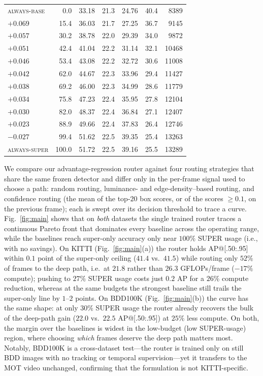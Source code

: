 \begin{table}[t]
\begin{minipage}[t]{0.49\textwidth}
\begin{tabular}{lrrrrrr}
\midrule
\textsc{always-base} & 0.0 & 33.18 & 21.3 & 24.76 & 40.4 & 8389\\
$+0.069$ & 15.4 & 36.03 & 21.7 & 27.25 & 36.7 & 9145\\
$+0.057$ & 30.2 & 38.78 & 22.0 & 29.39 & 34.0 & 9872\\
$+0.051$ & 42.4 & 41.04 & 22.2 & 31.14 & 32.1 & 10468\\
$+0.046$ & 53.4 & 43.08 & 22.2 & 32.72 & 30.6 & 11008\\
$+0.042$ & 62.0 & 44.67 & 22.3 & 33.96 & 29.4 & 11427\\
$+0.038$ & 69.2 & 46.00 & 22.3 & 34.99 & 28.6 & 11779\\
$+0.034$ & 75.8 & 47.23 & 22.4 & 35.95 & 27.8 & 12104\\
$+0.030$ & 82.0 & 48.37 & 22.4 & 36.84 & 27.1 & 12407\\
$+0.023$ & 88.9 & 49.66 & 22.4 & 37.83 & 26.4 & 12746\\
$-0.027$ & 99.4 & 51.62 & 22.5 & 39.35 & 25.4 & 13263\\
\textsc{always-super} & 100.0 & 51.72 & 22.5 & 39.16 & 25.5 & 13289\\
\bottomrule
\end{tabular}
\end{minipage}
\end{table}

We compare our advantage-regression router against four routing strategies that
share the same frozen detector and differ only in the per-frame signal used to
choose a path: random routing, luminance- and edge-density--based routing, and
confidence routing (the mean of the top-$20$ box scores, or of the scores
$\ge0.1$, on the previous frame); each is swept over its decision threshold to
trace a curve. Fig.~\ref{fig:main} shows that on \emph{both} datasets the single
trained router traces a continuous Pareto front that dominates every baseline across
the operating range, while the baselines reach super-only accuracy only near
$100\%$ SUPER usage (i.e., with no savings). On KITTI (Fig.~\ref{fig:main}(a)) the router holds
AP@[.50:.95] within $0.1$ point of the super-only ceiling ($41.4$ vs.\ $41.5$) while
routing only $52\%$ of frames to the deep path, i.e.\ at $21.8$ rather than $26.3$
GFLOPs/frame ($-17\%$ compute); pushing to $27\%$ SUPER usage costs just $0.2$ AP
for a $26\%$ compute reduction, whereas at the same budgets the strongest baseline
still trails the super-only line by $1$--$2$ points. On BDD100K
(Fig.~\ref{fig:main}(b)) the curve has the same shape: at only $30\%$ SUPER usage
the router already recovers the bulk of the deep-path gain ($22.0$ vs.\ $22.5$
AP@[.50:.95]) at $25\%$ less compute. On both, the margin over the baselines is
widest in the low-budget (low SUPER-usage) region, where choosing \emph{which}
frames deserve the deep path matters most. Notably, BDD100K is a cross-dataset
test---the router is trained only on still BDD images with no tracking or temporal
supervision---yet it transfers to the MOT video unchanged, confirming that the
formulation is not KITTI-specific.

